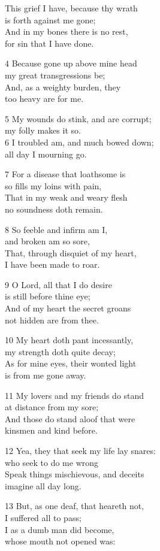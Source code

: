 \begin{multicols}{3}
This grief I have, because thy wrath\\
is forth against me gone;\\
And in my bones there is no rest,\\
for sin that I have done.

4 Because gone up above mine head\\
my great transgressions be;\\
And, as a weighty burden, they\\
too heavy are for me.

5 My wounds do stink, and are corrupt;\\
my folly makes it so.\\
6 I troubled am, and much bowed down;\\
all day I mourning go.

7 For a disease that loathsome is\\
so fills my loins with pain,\\
That in my weak and weary flesh\\
no soundness doth remain.

8 So feeble and infirm am I,\\
and broken am so sore,\\
That, through disquiet of my heart,\\
I have been made to roar.

9 O Lord, all that I do desire\\
is still before thine eye;\\
And of my heart the secret groans\\
not hidden are from thee.

10 My heart doth pant incessantly,\\
my strength doth quite decay;\\
As for mine eyes, their wonted light\\
is from me gone away.

11 My lovers and my friends do stand\\
at distance from my sore;\\
And those do stand aloof that were\\
kinsmen and kind before.

12 Yea, they that seek my life lay snares:\\
who seek to do me wrong\\
Speak things mischievous, and deceits\\
imagine all day long.

13 But, as one deaf, that heareth not,\\
I suffered all to pass;\\
I as a dumb man did become,\\
whose mouth not opened was:


\end{multicols}
